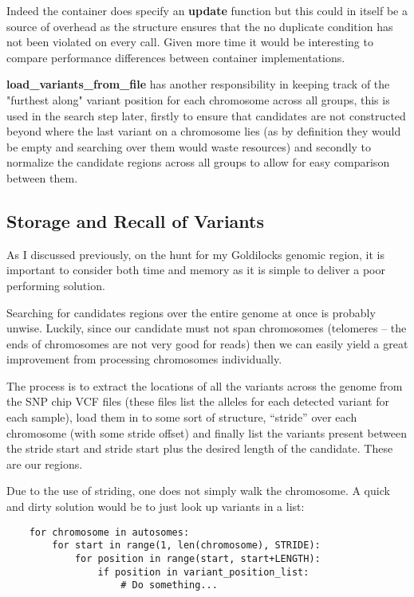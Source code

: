 Indeed the container does specify an \textbf{update} function but this could in
itself be a source of overhead as the structure ensures that the no duplicate
condition has not been violated on every call. Given more time it would be
interesting to compare performance differences between container implementations.

\textbf{load\_variants\_from\_file} has another responsibility in keeping track
of the "furthest along" variant position for each chromosome across all groups,
this is used in the search step later, firstly to ensure that candidates are not
constructed beyond where the last variant on a chromosome lies (as by definition
they would be empty and searching over them would waste resources) and secondly
to normalize the candidate regions across all groups to allow for easy
comparison between them.


\subsection{Storage and Recall of Variants}

As I discussed previously, on the hunt for my Goldilocks genomic region, it is
important to consider both time and memory as it is simple to deliver a poor
performing solution.

Searching for candidates regions over the entire genome at once is probably
unwise. Luckily, since our candidate must not span chromosomes (telomeres --
the ends of chromosomes are not very good for reads) then we can easily yield a
great improvement from processing chromosomes individually.

The process is to extract the locations of all the variants across the genome
from the SNP chip VCF files (these files list the alleles for each detected
variant for each sample), load them in to some sort of structure, “stride” over
each chromosome (with some stride offset) and finally list the variants present
between the stride start and stride start plus the desired length of the
candidate. These are our regions.

Due to the use of striding, one does not simply walk the chromosome. A quick
and dirty solution would be to just look up variants in a list:

\begin{verbatim}
    for chromosome in autosomes:
        for start in range(1, len(chromosome), STRIDE):
            for position in range(start, start+LENGTH):
                if position in variant_position_list:
                    # Do something...
\end{verbatim}

